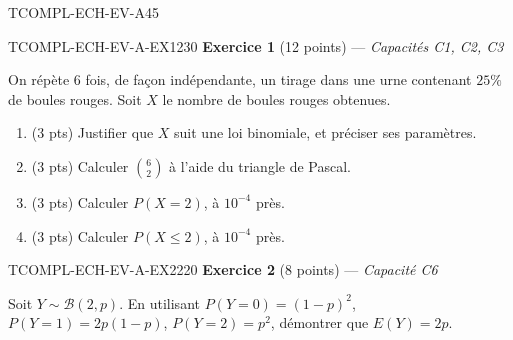 

\begin{evaluation}{TCOMPL-ECH-EV-A}{45}

\begin{exercice}{TCOMPL-ECH-EV-A-EX1}{2}{30}
\textbf{Exercice 1} (12 points) --- \textit{Capacités C1, C2, C3}

\medskip

On répète $6$ fois, de façon indépendante, un tirage dans une urne contenant $25\%$ de boules rouges. Soit $X$ le nombre de boules rouges obtenues.
\begin{enumerate}
  \item (3 pts) Justifier que $X$ suit une loi binomiale, et préciser ses paramètres.
  \item (3 pts) Calculer $\binom{6}{2}$ à l'aide du triangle de Pascal.
  \item (3 pts) Calculer $P(X=2)$, à $10^{-4}$ près.
  \item (3 pts) Calculer $P(X\leq2)$, à $10^{-4}$ près.
\end{enumerate}
\end{exercice}

\begin{exercice}{TCOMPL-ECH-EV-A-EX2}{2}{20}
\textbf{Exercice 2} (8 points) --- \textit{Capacité C6}

\medskip

Soit $Y \sim \mathcal{B}(2,p)$. En utilisant $P(Y=0)=(1-p)^2$, $P(Y=1)=2p(1-p)$, $P(Y=2)=p^2$, démontrer que $E(Y)=2p$.
\end{exercice}

\end{evaluation}
